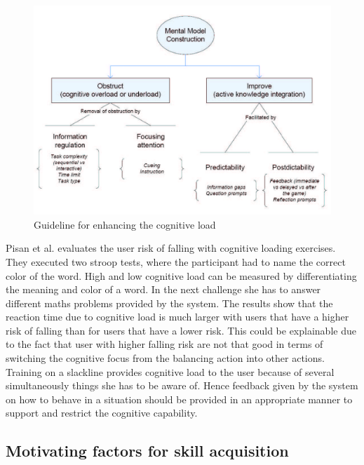 \begin{figure}[htb]
	\centering
	\begin{minipage}[t]{0.8\linewidth}
		\centering
		\includegraphics[width=1\linewidth]{Pictures/mentalModelConstruction}
		\caption{Guideline for enhancing the cognitive load \cite{Van_der_Spek2010-fe}}
		\label{fig:mentalModelConstruction}
	\end{minipage}
\end{figure}

Pisan et al. \cite{Pisan2013-sf} evaluates the user risk of falling with cognitive loading exercises. They executed two stroop tests, where the participant had to name the correct color of the word. High and low cognitive load can be measured by differentiating the meaning and color of a word. In the next challenge she has to answer different maths problems provided by the system. The results show that the reaction time due to cognitive load is much larger with users that have a higher risk of falling than for users that have a lower risk. This could be explainable due to the fact that user with higher falling risk are not that good in terms of switching the cognitive focus from the balancing action into other actions. Training on a slackline provides cognitive load to the user because of several simultaneously things she has to be aware of. Hence feedback given by the system on how to behave in a situation should be provided in an appropriate manner to support and restrict the cognitive capability.

\subsection{Motivating factors for skill acquisition}

